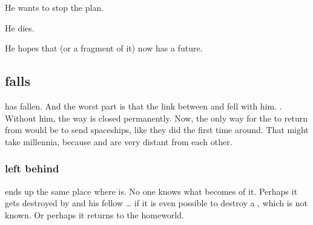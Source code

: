 He wants to stop the \iquin{} plan. 


He dies. 


He hopes that \Miith{} (or a fragment of it) now has a future. 












\subsection{\Daggerrain falls}
\Daggerrain{} has fallen. 
And the worst part is that the link between \Erebos{} and \Nyx{} fell with him. 
. Without him, the way is closed permanently. 
Now, the only way for the \banes{} to return from \Erebos{} would be to send spaceships, like they did the first time around. 
That might take millennia, because \Erebos{} and \Miith{} are very distant from each other. 





\subsubsection{\HothNrul{} left behind}
\HothNrul{} ends up the same place where \Daggerrain{} is. 
No one knows what becomes of it. 
Perhaps it gets destroyed by \Daggerrain{} and his fellow \banelords\ldots{} if it is even possible to destroy a \xs, which is not known. 
Or perhaps it returns to the \xs{} homeworld. 

